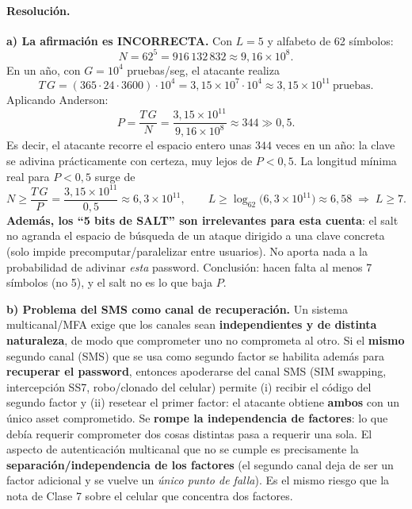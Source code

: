 \paragraph{Resolución.}
\textbf{a) La afirmación es INCORRECTA.} Con $L=5$ y alfabeto de 62 símbolos:
\begin{equation*}
  N = 62^{5} = 916\,132\,832 \approx 9{,}16\times10^{8}.
\end{equation*}
En un año, con $G=10^4$ pruebas/seg, el atacante realiza
\begin{equation*}
  T\,G = (365\cdot24\cdot3600)\cdot10^{4} = 3{,}15\times10^{7}\cdot10^{4} \approx 3{,}15\times10^{11}\ \text{pruebas}.
\end{equation*}
Aplicando Anderson:
\begin{equation*}
  P = \frac{T\,G}{N} = \frac{3{,}15\times10^{11}}{9{,}16\times10^{8}} \approx 344 \gg 0{,}5.
\end{equation*}
Es decir, el atacante recorre el espacio entero unas $344$ veces en un año: la clave se adivina prácticamente con certeza, muy lejos de $P<0{,}5$. La longitud mínima real para $P<0{,}5$ surge de
\begin{equation*}
  N \ge \frac{T\,G}{P} = \frac{3{,}15\times10^{11}}{0{,}5} \approx 6{,}3\times10^{11},
  \qquad L \ge \log_{62}\!\bigl(6{,}3\times10^{11}\bigr) \approx 6{,}58 \;\Rightarrow\; \boxed{L \ge 7}.
\end{equation*}
\textbf{Además, los ``5 bits de SALT'' son irrelevantes para esta cuenta}: el salt no agranda el espacio de búsqueda de un ataque dirigido a una clave concreta (solo impide precomputar/paralelizar entre usuarios). No aporta nada a la probabilidad de adivinar \emph{esta} password. Conclusión: hacen falta al menos 7 símbolos (no 5), y el salt no es lo que baja $P$.

\textbf{b) Problema del SMS como canal de recuperación.} Un sistema multicanal/MFA exige que los canales sean \textbf{independientes y de distinta naturaleza}, de modo que comprometer uno no comprometa al otro. Si el \textbf{mismo} segundo canal (SMS) que se usa como segundo factor se habilita además para \textbf{recuperar el password}, entonces apoderarse del canal SMS (SIM swapping, intercepción SS7, robo/clonado del celular) permite (i) recibir el código del segundo factor y (ii) resetear el primer factor: el atacante obtiene \textbf{ambos} con un único asset comprometido. Se \textbf{rompe la independencia de factores}: lo que debía requerir comprometer dos cosas distintas pasa a requerir una sola. El aspecto de autenticación multicanal que no se cumple es precisamente la \textbf{separación/independencia de los factores} (el segundo canal deja de ser un factor adicional y se vuelve un \emph{único punto de falla}). Es el mismo riesgo que la nota de Clase 7 sobre el celular que concentra dos factores.


